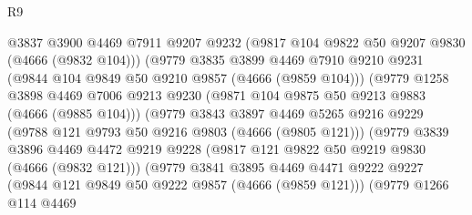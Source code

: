 \begin{lexlean}{R9}
\begin{coremodule}
                                  @3837
                                  @3900
                                  @4469
                                  @7911
                                  @9207
                                  @9232
                                  (@9817 @104 @9822 @50 @9207 @9830 (@4666 (@9832 @104)))
                                  (@9779
                                    @3835
                                    @3899
                                    @4469
                                    @7910
                                    @9210
                                    @9231
                                    (@9844 @104 @9849 @50 @9210 @9857 (@4666 (@9859 @104)))
                                    (@9779
                                      @1258
                                      @3898
                                      @4469
                                      @7006
                                      @9213
                                      @9230
                                      (@9871 @104 @9875 @50 @9213 @9883 (@4666 (@9885 @104)))
                                      (@9779
                                        @3843
                                        @3897
                                        @4469
                                        @5265
                                        @9216
                                        @9229
                                        (@9788 @121 @9793 @50 @9216 @9803 (@4666 (@9805 @121)))
                                        (@9779
                                          @3839
                                          @3896
                                          @4469
                                          @4472
                                          @9219
                                          @9228
                                          (@9817 @121 @9822 @50 @9219 @9830 (@4666 (@9832 @121)))
                                          (@9779
                                            @3841
                                            @3895
                                            @4469
                                            @4471
                                            @9222
                                            @9227
                                            (@9844 @121 @9849 @50 @9222 @9857 (@4666 (@9859 @121)))
                                            (@9779
                                              @1266
                                              @114
                                              @4469

\end{coremodule}
\end{lexlean}
